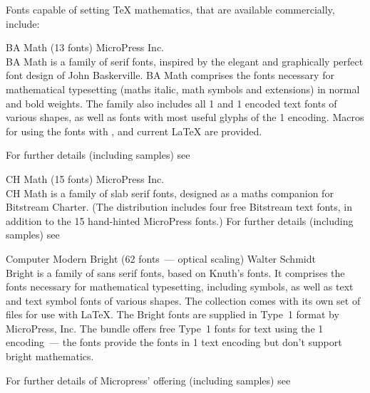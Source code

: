 Fonts capable of setting \TeX{} mathematics, that are available
commercially, include:
\begin{booklist}
\item[BA Math](13 fonts) MicroPress Inc.\\
  BA Math is a family of serif fonts, inspired by the elegant
  and graphically perfect font design of John Baskerville.  BA
  Math comprises the fonts necessary for mathematical typesetting
  (maths italic, math symbols and extensions) in normal and bold
  weights.  The family also includes all 1 and 1
  encoded text fonts of various shapes, as well as fonts with most
  useful glyphs of the 1 encoding.  Macros for using the
  fonts with \plaintex{}, \LaTeXo{} and current \LaTeX{} are
  provided.

  \nothtml{\bgroup\raggedwithindent}
  For further details (including samples) see\\
  \nothtml{\par\egroup}
\item[CH Math](15 fonts) MicroPress Inc.\\
  CH Math is a family of slab serif fonts, designed as a maths
  companion for Bitstream Charter.  (The distribution includes
  four free Bitstream text fonts, in addition to the 15 hand-hinted
  MicroPress fonts.)
  \nothtml{\bgroup\raggedwithindent}
  For further details (including samples) see\\
  \nothtml{\par\egroup}

\item[Computer Modern Bright](62 fonts~--- optical scaling) Walter
  Schmidt\\
   Bright is a family of sans serif fonts, based on Knuth's
   fonts.  It comprises the fonts necessary for mathematical
  typesetting, including  symbols, as well as text and text
  symbol fonts of various shapes.  The collection comes with its own
  set of files for use with \LaTeX{}.  The  Bright fonts are
  supplied in Type~1 format by MicroPress, Inc.   The
   bundle offers free Type~1 fonts for text using
  the 1 encoding~--- the  fonts provide the
  fonts in 1 text encoding but don't support  bright
  mathematics.

  \nothtml{\bgroup\raggedwithindent}
  For further details of Micropress' offering (including samples) see\\
  \nothtml{\par\egroup}


\end{booklist}
